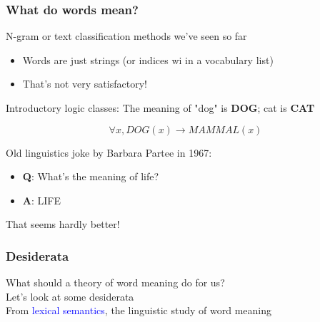 \documentclass[13.5pt,aspecratio=169, xcolor=dvipsnames]{beamer}
\begin{document}
\begin{frame}
    \onehalfspacing
        \frametitle{What do words mean?}
        
        N-gram or text classification methods we've seen so far
        \begin{itemize}
            \item Words are just strings (or indices wi in a vocabulary list)
            \item That's not very satisfactory!
        \end{itemize}


        \begin{block}{Introductory logic classes:}
            The meaning of "dog" is \textbf{DOG}; cat is \textbf{CAT}
            \vspace{-3em}
            \begin{center}
                $$ \forall x, DOG(x) \longrightarrow MAMMAL(x) $$
            \end{center}
        \end{block}

        Old linguistics joke by Barbara Partee in 1967:
        \begin{itemize}
            \item \textbf{Q}: What's the meaning of life?
            \item \textbf{A}: LIFE
        \end{itemize}

        \begin{minipage}{0.37\textwidth}
            \begin{block}{}
                That seems hardly better!
            \end{block}
        \end{minipage}
    \end{frame}
    

    \begin{frame}
    \onehalfspacing
        \frametitle{Desiderata}
        {\Large
        What should a theory of word meaning do for us? \\
        \vspace{2em}
        Let's look at some desiderata \\
        \vspace{2em}
        From \textcolor{blue}{lexical semantics}, the linguistic study of word meaning}
    \end{frame}
    
\end{document}
